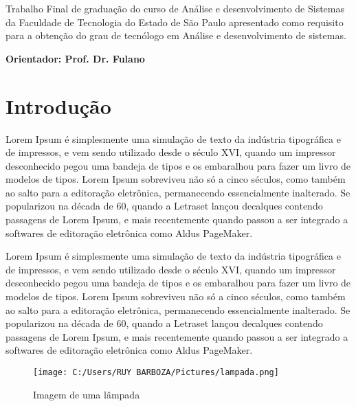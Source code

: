 \documentclass[12pt, a4paper, oneside]{book}
\begin{document}
\begin{flushright}

\begin{minipage}[t]{12cm}
\hrulefill

Trabalho Final de graduação do curso de Análise e desenvolvimento de Sistemas da Faculdade de Tecnologia do Estado de São Paulo apresentado como requisito para a obtenção do grau de tecnólogo em Análise e desenvolvimento de sistemas.

\hrulefill

\vspace{0.2cm}

{\bf Orientador: Prof. Dr. Fulano}

\end{minipage}

\end{flushright}
\newpage

\newpage

\chapter{Introdução}

Lorem Ipsum é simplesmente uma simulação de texto da indústria tipográfica e de impressos, e vem sendo utilizado desde o século XVI, quando um impressor desconhecido pegou uma bandeja de tipos e os embaralhou para fazer um livro de modelos de tipos. Lorem Ipsum sobreviveu não só a cinco séculos, como também ao salto para a editoração eletrônica, permanecendo essencialmente inalterado. Se popularizou na década de 60, quando a Letraset lançou decalques contendo passagens de Lorem Ipsum, e mais recentemente quando passou a ser integrado a softwares de editoração eletrônica como Aldus PageMaker.

Lorem Ipsum é simplesmente uma simulação de texto da indústria tipográfica e de impressos, e vem sendo utilizado desde o século XVI, quando um impressor desconhecido pegou uma bandeja de tipos e os embaralhou para fazer um livro de modelos de tipos. Lorem Ipsum sobreviveu não só a cinco séculos, como também ao salto para a editoração eletrônica, permanecendo essencialmente inalterado. Se popularizou na década de 60, quando a Letraset lançou decalques contendo passagens de Lorem Ipsum, e mais recentemente quando passou a ser integrado a softwares de editoração eletrônica como Aldus PageMaker.

\begin{figure} [h]
	\centering
	\texttt{[image: C:/Users/RUY BARBOZA/Pictures/lampada.png]}
	\label{ImagemLampada}			
\caption{Imagem de uma lâmpada}
\end{figure}
\end{document}
